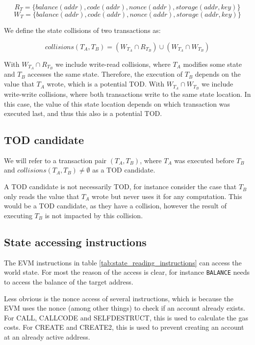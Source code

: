 \documentclass[draft,final]{vutinfth} %
\begin{document}
$$R_T = \{ balance(addr), code(addr), nonce(addr), storage(addr, key) \}$$
$$W_T = \{ balance(addr), code(addr), nonce(addr), storage(addr, key) \}$$

We define the state collisions of two transactions as:

$$collisions(T_A, T_B) = (W_{T_A} \cap R_{T_B}) \cup (W_{T_A} \cap W_{T_B})$$ 

With $W_{T_A} \cap R_{T_B}$ we include write-read collisions, where $T_A$ modifies some state and $T_B$ accesses the same state. Therefore, the execution of $T_B$ depends on the value that $T_A$ wrote, which is a potential TOD. With $W_{T_A} \cap W_{T_B}$ we include write-write collisions, where both transactions write to the same state location. In this case, the value of this state location depends on which transaction was executed last, and thus this also is a potential TOD.

\subsection{TOD candidate}

We will refer to a transaction pair $(T_A, T_B)$, where $T_A$ was executed before $T_B$ and $collisions(T_A, T_B) \neq \emptyset$ as a TOD candidate.

A TOD candidate is not necessarily TOD, for instance consider the case that $T_B$ only reads the value that $T_A$ wrote but never uses it for any computation. This would be a TOD candidate, as they have a collision, however the result of executing $T_B$ is not impacted by this collision.


\subsection{State accessing instructions}

The EVM instructions in table \ref{tab:state_reading_instructions} can access the world state. For most the reason of the access is clear, for instance \verb|BALANCE| needs to access the balance of the target address.

Less obvious is the nonce access of several instructions, which is because the EVM uses the nonce (among other things) to check if an account already exists. For CALL, CALLCODE and SELFDESTRUCT, this is used to calculate the gas costs. For CREATE and CREATE2, this is used to prevent creating an account at an already active address. \cite{wood_ethereum_2024}
\end{document}
